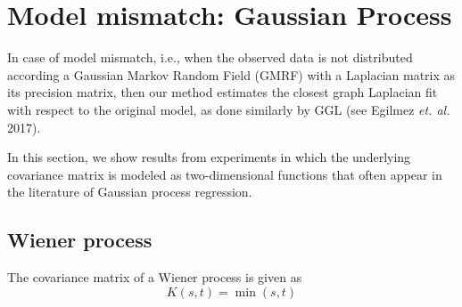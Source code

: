 \section{Model mismatch: Gaussian Process}

In case of model mismatch, i.e., when the observed data is not distributed according
a Gaussian Markov Random Field (GMRF) with a Laplacian matrix as its precision matrix,
then our method estimates the closest graph Laplacian fit with respect to the original
model, as done similarly by GGL (see Egilmez \textit{et. al.} 2017).

In this section, we show results from experiments in which the underlying covariance
matrix is modeled as two-dimensional functions that often appear in the literature of
Gaussian process regression.

\subsection{Wiener process}
The covariance matrix of a Wiener process is given as
\begin{equation}
  K(s, t) = \min(s, t)
\end{equation}


